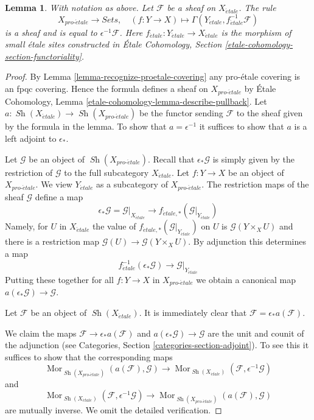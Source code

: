 \documentclass{stacks-project}
\theoremstyle{plain}
\newtheorem{lemma}[subsection]{Lemma}
\theoremstyle{definition}
\theoremstyle{remark}
\numberwithin{equation}{subsection}
\def\Mor{\mathop{\mathrm{Mor}}\nolimits}
\def\Sh{\mathop{\mathit{Sh}}\nolimits}
\def\proetale{{pro\text{-}\acute{e}tale}}
\def\etale{{\acute{e}tale}}
\begin{document}
\begin{lemma}
\label{lemma-describe-pullback-from-etale}
With notation as above. Let $\mathcal{F}$ be a sheaf on $X_\etale$.
The rule
$$
X_\proetale \longrightarrow \textit{Sets},\quad
(f : Y \to X) \longmapsto \Gamma(Y_\etale, f_\etale^{-1}\mathcal{F})
$$
is a sheaf and is equal to $\epsilon^{-1}\mathcal{F}$.
Here $f_\etale : Y_\etale \to X_\etale$ is the morphism of
small \'etale sites constructed in
\'Etale Cohomology, Section \ref{etale-cohomology-section-functoriality}.
\end{lemma}

\begin{proof}
By Lemma \ref{lemma-recognize-proetale-covering} any pro-\'etale covering
is an fpqc covering. Hence the formula defines a sheaf on $X_\proetale$
by \'Etale Cohomology, Lemma \ref{etale-cohomology-lemma-describe-pullback}.
Let $a : \Sh(X_\etale) \to \Sh(X_\proetale)$ be the functor
sending $\mathcal{F}$ to the sheaf given by the formula in the lemma.
To show that $a = \epsilon^{-1}$ it suffices to show that $a$ is a
left adjoint to $\epsilon_*$.

\medskip\noindent
Let $\mathcal{G}$ be an object of $\Sh(X_\proetale)$.
Recall that $\epsilon_*\mathcal{G}$ is simply given by the restriction of
$\mathcal{G}$ to the full subcategory $X_\etale$.
Let $f : Y \to X$ be an object of $X_\proetale$.
We view $Y_\etale$ as a subcategory of $X_\proetale$.
The restriction maps of the sheaf $\mathcal{G}$ define a map
$$
\epsilon_*\mathcal{G} = \mathcal{G}|_{X_\etale}
\longrightarrow
f_{\etale, *}(\mathcal{G}|_{Y_\etale})
$$
Namely, for $U$ in $X_\etale$ the value of
$f_{\etale, *}(\mathcal{G}|_{Y_\etale})$ on $U$
is $\mathcal{G}(Y \times_X U)$ and there is a restriction
map $\mathcal{G}(U) \to \mathcal{G}(Y \times_X U)$.
By adjunction this determines a map
$$
f_\etale^{-1}(\epsilon_*\mathcal{G}) \to \mathcal{G}|_{Y_\etale}
$$
Putting these together for all $f : Y \to X$ in $X_\proetale$
we obtain a canonical map $a(\epsilon_*\mathcal{G}) \to \mathcal{G}$.

\medskip\noindent
Let $\mathcal{F}$ be an object of $\Sh(X_\etale)$. It is immediately
clear that $\mathcal{F} = \epsilon_*a(\mathcal{F})$.

\medskip\noindent 
We claim the maps $\mathcal{F} \to \epsilon_*a(\mathcal{F})$ and
$a(\epsilon_*\mathcal{G}) \to \mathcal{G}$
are the unit and counit of the adjunction (see
Categories, Section \ref{categories-section-adjoint}).
To see this it suffices to show that the corresponding maps
$$
\Mor_{\Sh(X_\proetale)}(a(\mathcal{F}), \mathcal{G}) \to
\Mor_{\Sh(X_\etale)}(\mathcal{F}, \epsilon^{-1}\mathcal{G})
$$
and
$$
\Mor_{\Sh(X_\etale)}(\mathcal{F}, \epsilon^{-1}\mathcal{G}) \to
\Mor_{\Sh(X_\proetale)}(a(\mathcal{F}), \mathcal{G})
$$
are mutually inverse. We omit the detailed verification.
\end{proof}
\end{document}
